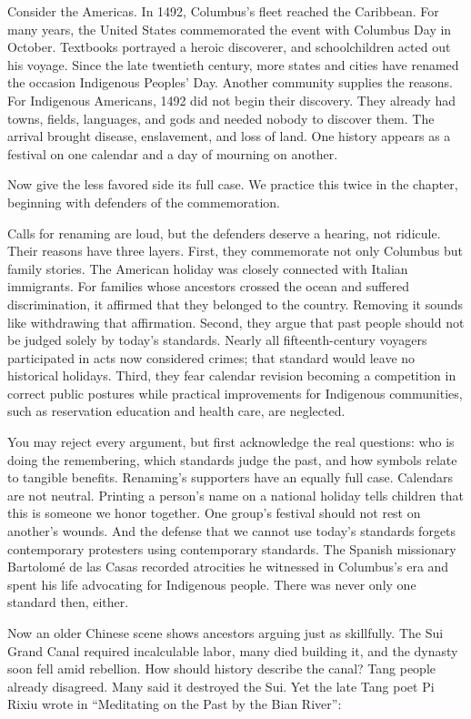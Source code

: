 Consider the Americas. In 1492, Columbus's fleet reached the Caribbean. For many years, the United States commemorated the event with Columbus Day in October. Textbooks portrayed a heroic discoverer, and schoolchildren acted out his voyage. Since the late twentieth century, more states and cities have renamed the occasion Indigenous Peoples' Day. Another community supplies the reasons. For Indigenous Americans, 1492 did not begin their discovery. They already had towns, fields, languages, and gods and needed nobody to discover them. The arrival brought disease, enslavement, and loss of land. One history appears as a festival on one calendar and a day of mourning on another.

Now give the less favored side its full case. We practice this twice in the chapter, beginning with defenders of the commemoration.

Calls for renaming are loud, but the defenders deserve a hearing, not ridicule. Their reasons have three layers. First, they commemorate not only Columbus but family stories. The American holiday was closely connected with Italian immigrants. For families whose ancestors crossed the ocean and suffered discrimination, it affirmed that they belonged to the country. Removing it sounds like withdrawing that affirmation. Second, they argue that past people should not be judged solely by today's standards. Nearly all fifteenth-century voyagers participated in acts now considered crimes; that standard would leave no historical holidays. Third, they fear calendar revision becoming a competition in correct public postures while practical improvements for Indigenous communities, such as reservation education and health care, are neglected.

You may reject every argument, but first acknowledge the real questions: who is doing the remembering, which standards judge the past, and how symbols relate to tangible benefits. Renaming's supporters have an equally full case. Calendars are not neutral. Printing a person's name on a national holiday tells children that this is someone we honor together. One group's festival should not rest on another's wounds. And the defense that we cannot use today's standards forgets contemporary protesters using contemporary standards. The Spanish missionary Bartolomé de las Casas recorded atrocities he witnessed in Columbus's era and spent his life advocating for Indigenous people. There was never only one standard then, either.

Now an older Chinese scene shows ancestors arguing just as skillfully. The Sui Grand Canal required incalculable labor, many died building it, and the dynasty soon fell amid rebellion. How should history describe the canal? Tang people already disagreed. Many said it destroyed the Sui. Yet the late Tang poet Pi Rixiu wrote in ``Meditating on the Past by the Bian River'':

